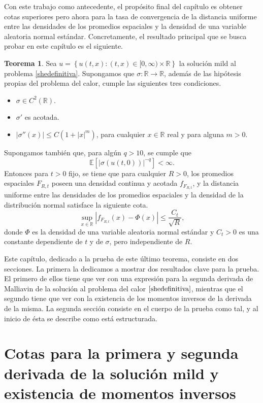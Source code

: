 \documentclass[letterpaper,twoside,12pt]{book}
\newcommand{\R}{\mathbb{R}}
\newcommand{\E}{\mathbb{E}}
\newcommand{\1}{\mathds{1}}
\newcommand{\abs}[1]{\left\lvert #1 \right\rvert}
\renewcommand{\to}{\rightarrow}
\theoremstyle{definition}
\theoremstyle{definition}
\newtheorem{teo}{Teorema}
\theoremstyle{remark}
\theoremstyle{definition}
\theoremstyle{definition}
\theoremstyle{definition}
\theoremstyle{definition}
\theoremstyle{definition}
\begin{document}
Con este trabajo como antecedente, el propósito final del capítulo es obtener cotas superiores pero ahora para la tasa de convergencia de la distancia uniforme entre las densidades de los promedios espaciales y la densidad de una variable aleatoria normal estándar. Concretamente, el resultado principal que se busca probar en este capítulo es el siguiente.
\begin{teo}\label{teoremaprincipal}
Sea $u=\left\{u(t,x):(t,x)\in [0,\infty)\times\R\right\}$ la solución mild al problema \eqref{shedefinitiva}. Supongamos que $\sigma:\R\to\R$, además de las hipótesis propias del problema del calor, cumple las siguientes tres condiciones.
\begin{itemize}
   \item $\sigma\in C^2(\R)$.
   \item $\sigma'$ es acotada.
   \item $\abs{\sigma''(x)}\leq C(1+\abs{x}^{m})$, \qquad para cualquier $x\in \R$ real y para alguna $m>0$.
\end{itemize}
Supongamos también que, para algún $q>10$, se cumple que 
\[
\E\left[\abs{\sigma(u(t,0))}^{-q}\right]<\infty.    
\]
Entonces para $t>0$ fijo, se tiene que para cualquier $R>0$, los promedios espaciales $F_{R,t}$ poseen una densidad continua y acotada $f_{F_{R,t}}$, y la distancia uniforme entre las densidades de los promedios espaciales y la densidad de la distribución normal satisface la siguiente cota.  
\[
\sup_{x\in \R} \abs{f_{F_{R,t}}(x)-\Phi(x)}\leq \frac{C_t}{\sqrt{R}},   
\]
donde $\Phi$ es la densidad de una variable aleatoria normal estándar y $C_t>0$ es una constante dependiente de $t$ y de $\sigma$, pero independiente de $R$.
\end{teo}

Este capítulo, dedicado a la prueba de este último teorema, consiste en dos secciones. La primera la dedicamos a mostrar dos resultados clave para la prueba. El primero de ellos tiene que ver con una expresión para la segunda derivada de Malliavin de la solución al problema del calor $\eqref{shedefinitiva}$, mientras que el segundo tiene que ver con la existencia de los momentos inversos de la derivada de la misma. La segunda sección consiste en el cuerpo de la prueba como tal, y al inicio de ésta se describe como está estructurada.

\section{Cotas para la primera y segunda derivada de la solución mild y existencia de momentos inversos}
\end{document}
